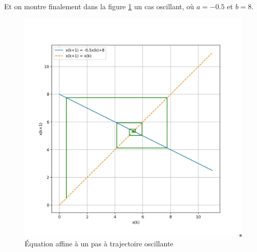             Et on montre finalement dans la figure \ref{fig:affine_3} un cas oscillant, où $a=-0.5$ et $b=8$.
            \begin{figure}[ht!]
                \centering
                \includegraphics[width=\textwidth]{images/affine_3.jpg}
                \caption{Équation affine à un pas à trajectoire oscillante}
                \label{fig:affine_3}
            \end{figure}
            
